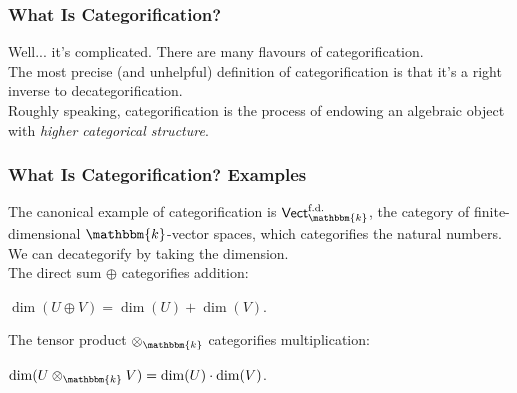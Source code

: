 \documentclass{beamer}
\newcommand*{\emphasis}[1]{\textcolor{structure}{\em #1}}
\begin{document}
\begin{frame}
\frametitle{What Is Categorification?}
Well... it's complicated. There are many flavours of categorification.\\[2ex]
The most precise (and unhelpful) definition of categorification is that it's a right inverse to decategorification.\\[2ex]
Roughly speaking, categorification is the process of endowing an algebraic object with \emphasis{higher categorical structure}.\\[2ex]
\end{frame}

\begin{frame}
\frametitle{What Is Categorification? Examples}
The canonical example of categorification is $\textsf{Vect}^\text{f.d.}_\mathbbm{k}$, the category of finite-dimensional $\mathbbm{k}$-vector spaces, which categorifies the natural numbers.\\[2ex]
We can decategorify by taking the dimension.\\[2ex]
The direct sum $\oplus$ categorifies addition:
\begin{center}$\dim(U \oplus V) = \dim(U) + \dim(V)$.\end{center}
The tensor product $\otimes_\mathbbm{k}$ categorifies multiplication:
\begin{center}$\dim(U \otimes_\mathbbm{k} V) = \dim(U) \cdot \dim(V)$.\end{center}
\end{frame}
\end{document}
